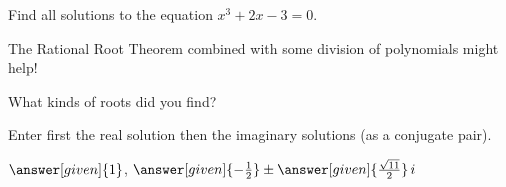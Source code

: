 \documentclass[nooutcomes]{ximera}
\begin{document}
\begin{problem}
Find all solutions to the equation $x^3+2x-3=0$. 
\begin{hint} 
The Rational Root Theorem combined with some division of polynomials might help!
\end{hint}
What kinds of roots did you find? 
\begin{multipleChoice}
\end{multipleChoice}
\begin{problem}
Enter first the real solution then the imaginary solutions (as a conjugate pair).

\begin{prompt}
$\answer[given]{1}$, $\answer[given]{-\frac{1}{2}} \pm \answer[given]{\frac{\sqrt{11}}{2}}\,i$
\end{prompt}
\end{problem}
\end{problem}


%
\end{document}
